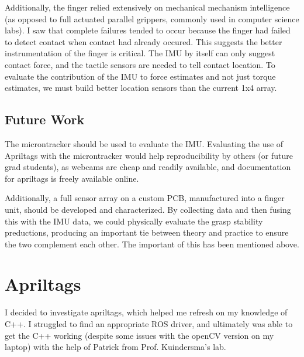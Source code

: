 \documentclass[preprint,12pt,3p]{elsarticle}
\begin{document}
Additionally, the finger relied extensively on mechanical mechanism intelligence (as opposed to full
actuated parallel grippers, commonly used in computer science labs).  I saw that complete failures
tended to occur because the finger had failed to detect contact when contact had already occured.
This suggests the better instrumentation of the finger is critical. The IMU by itself can only
suggest contact force, and the tactile sensors are needed to tell contact location. To evaluate the
contribution of the IMU to force estimates and not just torque estimates, we must build better
location sensors than the current 1x4 array.


%
%

\subsection{Future Work}

The microntracker should be used to evaluate the IMU. Evaluating the use of Apriltags with the
microntracker would help reproducibility by others (or future grad students), as webcams are cheap
and readily available, and documentation for apriltags is freely available online.

Additionally, a full sensor array on a custom PCB, manufactured into a finger unit, should be
developed and characterized. By collecting data and then fusing this with the IMU data, we could
physically evaluate the grasp stability preductions, producing an important tie between theory and
practice to ensure the two complement each other. The important of this has been mentioned above.

\newpage
\newpage

\clearpage
\vspace*{\fill}
\begin{center}
\begin{minipage}{.6\textwidth}
\Huge
{}
\normalsize
\end{minipage}
\end{center}
\vfill %
\clearpage

\appendix

\section{Apriltags}
I decided to investigate apriltags, which helped me refresh on my knowledge of C++. I struggled to
find an appropriate ROS driver, and ultimately was able to get the C++ working (despite some issues
with the openCV version on my laptop) with the help of Patrick from Prof. Kuindersma's lab.
\end{document}
